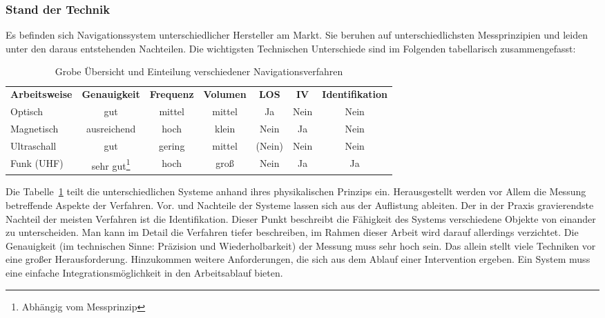 \subsubsection{Stand der Technik}
Es befinden sich Navigationssystem unterschiedlicher Hersteller am Markt. Sie beruhen auf unterschiedlichsten Messprinzipien und leiden unter den daraus entstehenden Nachteilen. Die wichtigsten Technischen Unterschiede sind im Folgenden tabellarisch zusammengefasst:
%
\begin{table} [H]
	\begin{center}
		\begin{tabular}{lcccccc}
			\textbf{Arbeitsweise} & \textbf{Genauigkeit} & \textbf{Frequenz} &\textbf{Volumen} & \textbf{LOS} & \textbf{IV} & \textbf{Identifikation}\\
			Optisch & gut & mittel & mittel & Ja & Nein & Nein \\
			Magnetisch & ausreichend & hoch & klein & Nein & Ja & Nein \\
			Ultraschall & gut & gering & mittel & (Nein) & Nein & Nein \\
			Funk (UHF) & sehr gut\footnote{Abhängig vom Messprinzip} & hoch & groß & Nein & Ja & Ja \\
%			
		\end{tabular}
	\end{center}
	\caption[Übersicht Navigationsverfahren]{Grobe Übersicht und Einteilung verschiedener Navigationsverfahren}
	\label{tab:overview_tracking}
\end{table}
%
Die Tabelle~\ref{tab:overview_tracking} teilt die unterschiedlichen Systeme anhand ihres physikalischen Prinzips ein. Herausgestellt werden vor Allem die Messung betreffende Aspekte der Verfahren. Vor. und Nachteile der Systeme lassen sich aus der Auflistung ableiten. Der in der Praxis gravierendste Nachteil der meisten Verfahren ist die Identifikation. Dieser Punkt beschreibt die Fähigkeit des Systems verschiedene Objekte von einander zu unterscheiden. 
%
Man kann im Detail die Verfahren tiefer beschreiben, im Rahmen dieser Arbeit wird darauf allerdings verzichtet.
%
Die Genauigkeit (im technischen Sinne: Präzision und Wiederholbarkeit) der Messung muss sehr hoch sein. Das allein stellt viele Techniken vor eine großer Herausforderung. Hinzukommen weitere Anforderungen, die sich aus dem Ablauf einer Intervention ergeben. Ein System muss eine einfache Integrationsmöglichkeit in den Arbeitsablauf bieten.
